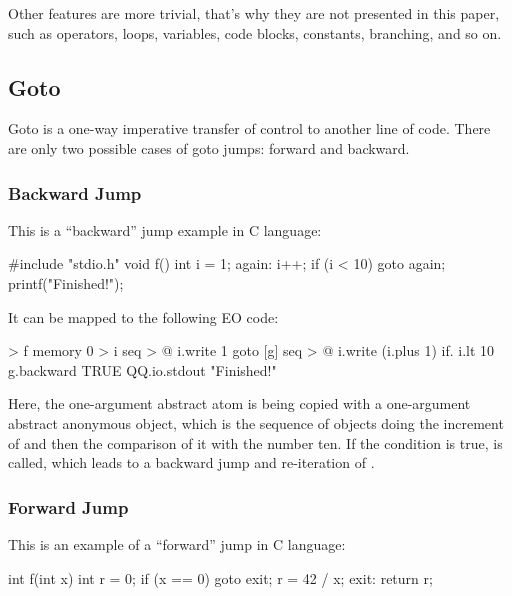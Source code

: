 \documentclass[sigplan,11pt,nonacm,natbib=false]{acmart}
\begin{document}
Other features are more trivial, that's why they are not presented in this paper, such as operators, loops, variables, code blocks, constants, branching, and so on.

\subsection{Goto}
\label{sec:goto}
 
Goto is a one-way imperative transfer of control to another line of code. There are only two possible cases of goto jumps: forward and backward. 

\subsubsection{Backward Jump}

This is a ``backward'' jump example in C language:

\begin{ffcode}
#include "stdio.h"
void f() {
  int i = 1;
  again:
  i++;
  if (i < 10) goto again;
  printf("Finished!");
}
\end{ffcode}

It can be mapped to the following EO code:

\begin{ffcode}
[] > f
  memory 0 > i
  seq > @
    i.write 1
    goto
      [g]
        seq > @
          i.write (i.plus 1)
          if.
            i.lt 10
            g.backward
            TRUE
    QQ.io.stdout "Finished!"
\end{ffcode}

Here, the one-argument abstract atom  is being copied with a one-argument abstract anonymous object, which is the sequence of objects doing the increment of  and then the comparison of it with the number ten. If the condition is true,  is called, which leads to a backward jump and re-iteration of .

\subsubsection{Forward Jump}

This is an example of a ``forward'' jump in C language:

\begin{ffcode}
int f(int x) {
  int r = 0;
  if (x == 0) goto exit;
  r = 42 / x;
  exit:
  return r;
}
\end{ffcode}
\end{document}

